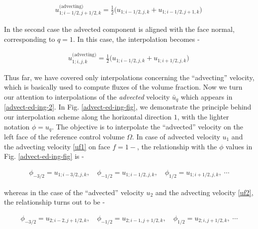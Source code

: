 \begin{align}
 u_{1;i-1/2,j+1/2,k}^{\textrm{(advecting)}} = \frac12 \big( u_{1;i-1/2,j,k} + u_{1;i-1/2,j+1,k} 
\big) \,
\label{uf2}
\end{align}


In the second case the advected component is aligned with the 
face normal, corresponding to $q=1$. 
In this case, the interpolation becomes -  


\begin{align}
	u_{1;i,j,k}^{\textrm{(advecting)}} = \frac12 \big( u_{1;i-1/2,j,k} + u_{1;i+1/2,j,k} \big) \,
\label{uf1} 
\end{align}
 

Thus far, we have covered only interpolations
concerning the ``advecting'' velocity, which is basically
used to compute fluxes of the volume fraction. 
Now we turn our attention to interpolations of the \textit{advected}
velocity $\bar u_{q}$ which appears in \eqref{advect-ed-ing-2}. 
In Fig. \ref{advect-ed-ing-fig}, we demonstrate the principle 
behind our interpolation scheme along the horizontal direction $1$, 
with the lighter notation $\phi = u_q$.
The objective is to interpolate the ``advected'' velocity on the left face
of the reference control volume $\Omega$.
In case of advected velocity $u_1$ and the advecting velocity \eqref{uf1} on face
$f=1-$, the relationship with the $\phi$ values in Fig. \ref{advect-ed-ing-fig} is -


\begin{align}
\phi_{-3/2} = u_{1;i-3/2,j,k}, \quad \phi_{-1/2} = u_{1;i-1/2,j,k}, \quad   
\phi_{1/2} = u_{1;i+1/2,j,k}, \;\cdots
\end{align}


whereas in the case of the ``advected'' velocity $u_2$ and the advecting velocity \eqref{uf2},
the relationship turns out to be -


\begin{align}
\phi_{-3/2} = u_{2;i-2,j+1/2,k}, \quad  \phi_{-1/2} = u_{2;i-1,j+1/2,k}, 
\quad  \phi_{1/2} = u_{2;i,j+1/2,k}, \;\cdots
\end{align}

